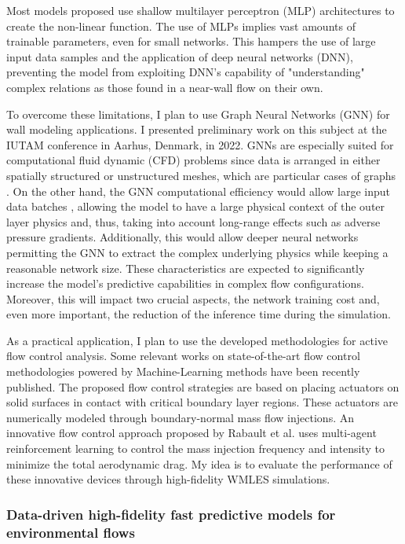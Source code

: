 \documentclass{article}
\begin{document}
Most models proposed use shallow multilayer perceptron (MLP) architectures \cite{VAR23} to create the non-linear function. The use of MLPs implies vast amounts of trainable parameters, even for small networks. This hampers the use of large input data samples and the application of deep neural networks (DNN), preventing the model from exploiting DNN's capability of "understanding"  complex relations as those found in a near-wall flow on their own. 

To overcome these limitations, I plan to use Graph Neural Networks (GNN) for wall modeling applications. I presented preliminary work on this subject at the IUTAM conference in Aarhus, Denmark, in 2022. GNNs are especially suited for computational fluid dynamic (CFD) problems since data is arranged in either spatially structured or unstructured meshes, which are particular cases of graphs \cite{ZHO20}. On the other hand, the GNN computational efficiency would allow large input data batches \cite{GAO22}, allowing the model to have a large physical context of the outer layer physics and, thus, taking into account long-range effects such as adverse pressure gradients. Additionally, this would allow deeper neural networks permitting the GNN to extract the complex underlying physics while keeping a reasonable network size. These characteristics are expected to significantly increase the model's predictive capabilities in complex flow configurations. Moreover, this will impact two crucial aspects, the network training cost and, even more important, the reduction of the inference time during the simulation. 

As a practical application, I plan to use the developed methodologies for active flow control analysis. Some relevant works on state-of-the-art flow control methodologies powered by Machine-Learning methods \cite{GUA23} have been recently published. The proposed flow control strategies are based on placing actuators on solid surfaces in contact with critical boundary layer regions. These actuators are numerically modeled through boundary-normal mass flow injections. An innovative flow control approach proposed by Rabault et al. \cite{RAB19} uses multi-agent reinforcement learning to control the mass injection frequency and intensity to minimize the total aerodynamic drag. My idea is to evaluate the performance of these innovative devices through high-fidelity WMLES simulations.

\subsubsection{Data-driven high-fidelity fast predictive models for environmental flows}
\end{document}

